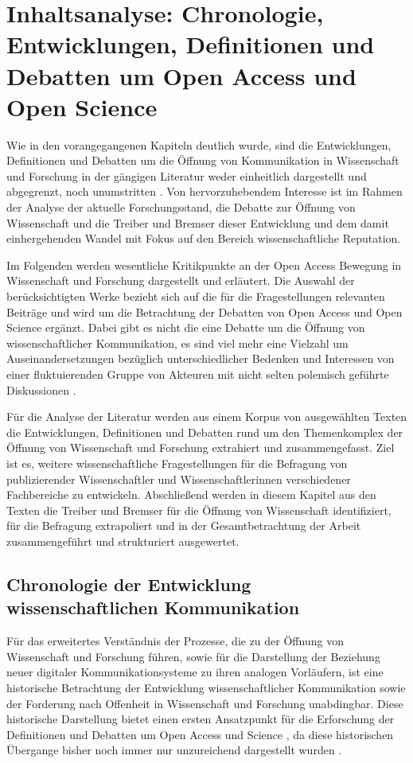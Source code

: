 \chapter{Inhaltsanalyse: Chronologie, Entwicklungen, Definitionen und Debatten um Open Access und Open Science}

Wie in den vorangegangenen Kapiteln deutlich wurde, sind die Entwicklungen, Definitionen und Debatten um die Öffnung von Kommunikation in Wissenschaft und Forschung in der gängigen Literatur weder einheitlich dargestellt und abgegrenzt, noch unumstritten \cite{muller_2010_open} \cite{schulze_2013_open}. Von hervorzuhebendem Interesse ist im Rahmen der Analyse der aktuelle Forschungsstand, die Debatte zur Öffnung von Wissenschaft und die Treiber und Bremser dieser Entwicklung und dem damit einhergehenden Wandel mit Fokus auf den Bereich wissenschaftliche Reputation.

Im Folgenden werden wesentliche Kritikpunkte an der Open Access Bewegung in Wissenschaft und Forschung dargestellt und erläutert. Die Auswahl der berücksichtigten Werke bezieht sich auf die für die Fragestellungen relevanten Beiträge und wird um die Betrachtung der Debatten von Open Access und Open Science ergänzt. Dabei gibt es nicht die eine Debatte um die Öffnung von wissenschaftlicher Kommunikation, es sind viel mehr eine Vielzahl um Auseinandersetzungen bezüglich unterschiedlicher Bedenken und Interessen von einer fluktuierenden Gruppe von Akteuren \cite{Beals_2013} mit nicht selten polemisch geführte Diskussionen \cite{Lossau_oa_2007}.

Für die Analyse der Literatur werden aus einem Korpus von ausgewählten Texten die Entwicklungen, Definitionen und Debatten rund um den Themenkomplex der Öffnung von Wissenschaft und Forschung extrahiert und zusammengefasst. Ziel ist es, weitere wissenschaftliche Fragestellungen für die Befragung von publizierender Wissenschaftler und Wissenschaftlerinnen verschiedener Fachbereiche zu entwickeln. Abschließend werden in diesem Kapitel aus den Texten die Treiber und Bremser für die Öffnung von Wissenschaft identifiziert, für die Befragung extrapoliert und in der Gesamtbetrachtung der Arbeit zusammengeführt und strukturiert ausgewertet.

\section{Chronologie der Entwicklung wissenschaftlichen Kommunikation}

Für das erweitertes Verständnis der Prozesse, die zu der Öffnung von Wissenschaft und Forschung führen, sowie für die Darstellung der Beziehung neuer digitaler Kommunikationsysteme zu ihren analogen Vorläufern, ist eine historische Betrachtung der Entwicklung wissenschaftlicher Kommunikation sowie der Forderung nach Offenheit in Wissenschaft und Forschung unabdingbar.
Diese historische Darstellung bietet einen ersten Ansatzpunkt für die Erforschung der Definitionen und Debatten um Open Access und Science \cite{Scheliga_2014}, da diese historischen Übergange bisher noch immer nur unzureichend dargestellt wurden \cite{CREATe_2014}.

